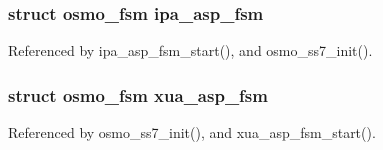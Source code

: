 \subsubsection[{ipa\+\_\+asp\+\_\+fsm}]{\setlength{\rightskip}{0pt plus 5cm}struct osmo\+\_\+fsm ipa\+\_\+asp\+\_\+fsm}\label{xua__asp__fsm_8h_a43e75ddbe7932fe493cb59d8248e0c98}


Referenced by ipa\+\_\+asp\+\_\+fsm\+\_\+start(), and osmo\+\_\+ss7\+\_\+init().

\subsubsection[{xua\+\_\+asp\+\_\+fsm}]{\setlength{\rightskip}{0pt plus 5cm}struct osmo\+\_\+fsm xua\+\_\+asp\+\_\+fsm}\label{xua__asp__fsm_8h_a14fb53dcfac1cdad274b0c88192517dd}


Referenced by osmo\+\_\+ss7\+\_\+init(), and xua\+\_\+asp\+\_\+fsm\+\_\+start().

